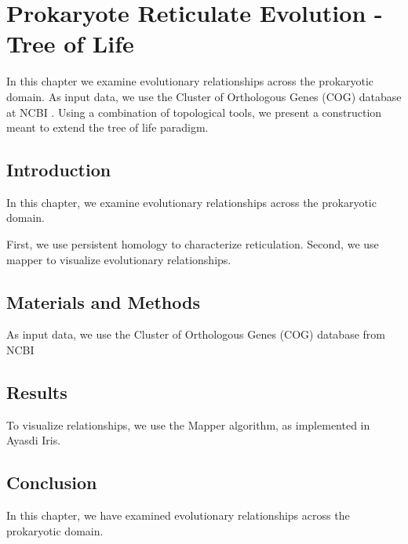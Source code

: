 \chapter{Prokaryote Reticulate Evolution - Tree of Life}
\label{ch:prokaryotes}

In this chapter we examine evolutionary relationships across the prokaryotic domain.
As input data, we use the Cluster of Orthologous Genes (COG) database at NCBI \cite{Galperin:2014ua}.
Using a combination of topological tools, we present a construction meant to extend the tree of life paradigm.

\section{Introduction}

In this chapter, we examine evolutionary relationships across the prokaryotic domain.

First, we use persistent homology to characterize reticulation.
Second, we use mapper to visualize evolutionary relationships.

\section{Materials and Methods}

As input data, we use the Cluster of Orthologous Genes (COG) database from NCBI \cite{Galperin:2014ua}


\section{Results}


To visualize relationships, we use the Mapper algorithm, as implemented in Ayasdi Iris.

\section{Conclusion}

In this chapter, we have examined evolutionary relationships across the prokaryotic domain.
